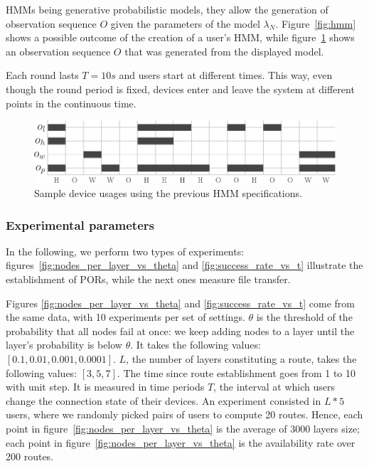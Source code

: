 HMMs being generative probabilistic models, they allow the generation of observation sequence $O$ given the parameters of the model $\lambda_N$.
Figure~\ref{fig:hmm} shows a possible outcome of the creation of a user's HMM, while figure~\ref{fig:sample_usage} shows an observation sequence $O$ that was generated from the displayed model.

Each round lasts $T=10s$  and users start at different times. 
This way, even though the round period is fixed, devices enter and leave the system at different points in the continuous time.


\begin{figure}[t]
\centering
\includegraphics[width=\columnwidth]{figures/sample_usage.pdf}

\caption{\label{fig:sample_usage}Sample device usages using the previous HMM specifications. 
}
\end{figure}

\subsubsection{Experimental parameters} %
\label{ssub:experimental_parameters}

In the following, we perform two types of experiments: figures~\ref{fig:nodes_per_layer_vs_theta} and \ref{fig:success_rate_vs_t} illustrate the establishment of PORs, while the next ones measure file transfer.

Figures \ref{fig:nodes_per_layer_vs_theta} and \ref{fig:success_rate_vs_t} come from the same data, with 10 experiments per set of settings.
$\theta$ is the threshold of the probability that all nodes fail at once: we keep adding nodes to a layer until the layer's probability is below $\theta$. 
It takes the following values: $[0.1, 0.01, 0.001, 0.0001]$.
$L$, the number of layers constituting a route, takes the following values: $[3, 5, 7]$.
The time since route establishment goes from 1 to 10 with  unit step.
It is measured in time periods $T$, the interval at which users change the connection state of their devices.
An experiment consisted in $L*5$ users, where we randomly picked pairs of users to compute 20 routes.
Hence, each point in figure~\ref{fig:nodes_per_layer_vs_theta} is the average of 3000 layers size; 
each point in figure~\ref{fig:nodes_per_layer_vs_theta} is the availability rate over 200 routes.


